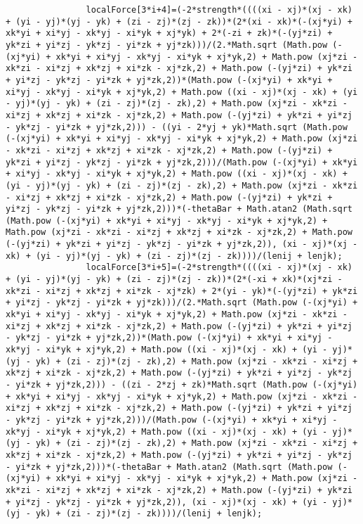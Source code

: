 \begin{lstlisting}
				localForce[3*i+4]=(-2*strength*((((xi - xj)*(xj - xk) + (yi - yj)*(yj - yk) + (zi - zj)*(zj - zk))*(2*(xi - xk)*(-(xj*yi) + xk*yi + xi*yj - xk*yj - xi*yk + xj*yk) + 2*(-zi + zk)*(-(yj*zi) + yk*zi + yi*zj - yk*zj - yi*zk + yj*zk)))/(2.*Math.sqrt (Math.pow (-(xj*yi) + xk*yi + xi*yj - xk*yj - xi*yk + xj*yk,2) + Math.pow (xj*zi - xk*zi - xi*zj + xk*zj + xi*zk - xj*zk,2) + Math.pow (-(yj*zi) + yk*zi + yi*zj - yk*zj - yi*zk + yj*zk,2))*(Math.pow (-(xj*yi) + xk*yi + xi*yj - xk*yj - xi*yk + xj*yk,2) + Math.pow ((xi - xj)*(xj - xk) + (yi - yj)*(yj - yk) + (zi - zj)*(zj - zk),2) + Math.pow (xj*zi - xk*zi - xi*zj + xk*zj + xi*zk - xj*zk,2) + Math.pow (-(yj*zi) + yk*zi + yi*zj - yk*zj - yi*zk + yj*zk,2))) - ((yi - 2*yj + yk)*Math.sqrt (Math.pow (-(xj*yi) + xk*yi + xi*yj - xk*yj - xi*yk + xj*yk,2) + Math.pow (xj*zi - xk*zi - xi*zj + xk*zj + xi*zk - xj*zk,2) + Math.pow (-(yj*zi) + yk*zi + yi*zj - yk*zj - yi*zk + yj*zk,2)))/(Math.pow (-(xj*yi) + xk*yi + xi*yj - xk*yj - xi*yk + xj*yk,2) + Math.pow ((xi - xj)*(xj - xk) + (yi - yj)*(yj - yk) + (zi - zj)*(zj - zk),2) + Math.pow (xj*zi - xk*zi - xi*zj + xk*zj + xi*zk - xj*zk,2) + Math.pow (-(yj*zi) + yk*zi + yi*zj - yk*zj - yi*zk + yj*zk,2)))*(-thetaBar + Math.atan2 (Math.sqrt (Math.pow (-(xj*yi) + xk*yi + xi*yj - xk*yj - xi*yk + xj*yk,2) + Math.pow (xj*zi - xk*zi - xi*zj + xk*zj + xi*zk - xj*zk,2) + Math.pow (-(yj*zi) + yk*zi + yi*zj - yk*zj - yi*zk + yj*zk,2)), (xi - xj)*(xj - xk) + (yi - yj)*(yj - yk) + (zi - zj)*(zj - zk))))/(lenij + lenjk);
				localForce[3*i+5]=(-2*strength*((((xi - xj)*(xj - xk) + (yi - yj)*(yj - yk) + (zi - zj)*(zj - zk))*(2*(-xi + xk)*(xj*zi - xk*zi - xi*zj + xk*zj + xi*zk - xj*zk) + 2*(yi - yk)*(-(yj*zi) + yk*zi + yi*zj - yk*zj - yi*zk + yj*zk)))/(2.*Math.sqrt (Math.pow (-(xj*yi) + xk*yi + xi*yj - xk*yj - xi*yk + xj*yk,2) + Math.pow (xj*zi - xk*zi - xi*zj + xk*zj + xi*zk - xj*zk,2) + Math.pow (-(yj*zi) + yk*zi + yi*zj - yk*zj - yi*zk + yj*zk,2))*(Math.pow (-(xj*yi) + xk*yi + xi*yj - xk*yj - xi*yk + xj*yk,2) + Math.pow ((xi - xj)*(xj - xk) + (yi - yj)*(yj - yk) + (zi - zj)*(zj - zk),2) + Math.pow (xj*zi - xk*zi - xi*zj + xk*zj + xi*zk - xj*zk,2) + Math.pow (-(yj*zi) + yk*zi + yi*zj - yk*zj - yi*zk + yj*zk,2))) - ((zi - 2*zj + zk)*Math.sqrt (Math.pow (-(xj*yi) + xk*yi + xi*yj - xk*yj - xi*yk + xj*yk,2) + Math.pow (xj*zi - xk*zi - xi*zj + xk*zj + xi*zk - xj*zk,2) + Math.pow (-(yj*zi) + yk*zi + yi*zj - yk*zj - yi*zk + yj*zk,2)))/(Math.pow (-(xj*yi) + xk*yi + xi*yj - xk*yj - xi*yk + xj*yk,2) + Math.pow ((xi - xj)*(xj - xk) + (yi - yj)*(yj - yk) + (zi - zj)*(zj - zk),2) + Math.pow (xj*zi - xk*zi - xi*zj + xk*zj + xi*zk - xj*zk,2) + Math.pow (-(yj*zi) + yk*zi + yi*zj - yk*zj - yi*zk + yj*zk,2)))*(-thetaBar + Math.atan2 (Math.sqrt (Math.pow (-(xj*yi) + xk*yi + xi*yj - xk*yj - xi*yk + xj*yk,2) + Math.pow (xj*zi - xk*zi - xi*zj + xk*zj + xi*zk - xj*zk,2) + Math.pow (-(yj*zi) + yk*zi + yi*zj - yk*zj - yi*zk + yj*zk,2)), (xi - xj)*(xj - xk) + (yi - yj)*(yj - yk) + (zi - zj)*(zj - zk))))/(lenij + lenjk);

\end{lstlisting}
